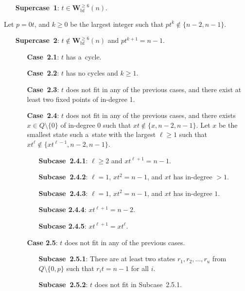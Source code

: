 \documentclass{amsart}
\renewcommand{\ge}{\geqslant}
\newcommand{\Wbf}{\mathbf{W}^{\ge 6}_{\mathrm{bf}}}
\begin{document}
{
\begin{enumerate}[leftmargin=*,widest=\textbf{Supercase~1}]
\item[\textbf{Supercase~1}:]
$t \in \Wbf(n)$.
\end{enumerate}

Let $p=0t$, and $k \ge 0$ be the largest integer such that $pt^k \notin \{n-2,n-1\}$.
\begin{enumerate}[leftmargin=*,widest=\textbf{Supercase~1}]
\item[\textbf{Supercase~2}:]
$t \notin \Wbf(n)$ and $pt^{k+1} = n-1$.
\begin{enumerate}[leftmargin=*,widest=\textbf{Case~2.1}]
\item[\textbf{Case~2.1}:] $t$ has a~cycle.
\item[\textbf{Case~2.2}:] $t$ has no cycles and $k \ge 1$.
\item[\textbf{Case~2.3}:] $t$ does not fit in any of the previous cases, and there exist at least two fixed points of in-degree 1.
\item[\textbf{Case~2.4}:] $t$ does not fit in any of the previous cases, and there exists $x \in Q\setminus \{0\}$ of in-degree $0$ such that $xt \notin \{x,n-2,n-1\}$.
Let $x$ be the smallest state such a~state with the largest $\ell\ge 1$ such that $xt^\ell \notin \{xt^{\ell-1},n-2,n-1\}$.
\begin{enumerate}[leftmargin=*,widest=\textbf{Subcase~2.4.1}]
\item[\textbf{Subcase~2.4.1}:] $\ell\ge 2$ and $xt^{\ell+1} = n-1$.
\item[\textbf{Subcase~2.4.2}:] $\ell=1$, $xt^2 = n-1$, and $xt$ has in-degree $>1$.
\item[\textbf{Subcase~2.4.3}:] $\ell=1$, $xt^2 = n-1$, and $xt$ has in-degree $1$.
\item[\textbf{Subcase 2.4.4}:] $xt^{\ell+1} = n-2$.
\item[\textbf{Subcase 2.4.5}:] $xt^{\ell+1} = xt^\ell$.
\end{enumerate}
\item[\textbf{Case 2.5}:] $t$ does not fit in any of the previous cases.
\begin{enumerate}[leftmargin=*,widest=\textbf{Subcase~2.5.1}]
\item[\textbf{Subcase~2.5.1}:] There are at least two states $r_1,r_2,\ldots,r_u$ from $Q \setminus \{0,p\}$ such that $r_i t = n-1$ for all $i$.
\item[\textbf{Subcase~2.5.2}:] $t$ does not fit in Subcase~2.5.1.
\end{enumerate}

\end{enumerate}
\end{enumerate}}
\end{document}
